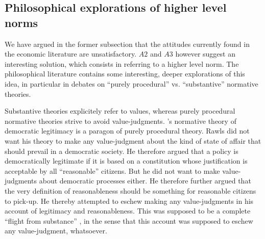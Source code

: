\documentclass[preprint, french, english, 11pt, authoryear]{elsarticle}%
\begin{document}
\subsection{Philosophical explorations of higher level norms}
We have argued in the former subsection that the attitudes currently found in the economic literature are unsatisfactory. $A2$ and $A3$ however suggest an interesting solution, which consists in referring to a higher level norm. The philosophical literature contains some interesting, deeper explorations of this idea, in particular in debates on “purely procedural” vs. “substantive” normative theories.

Substantive theories explicitely refer to values, whereas purely procedural normative theories strive to avoid value-judgments. \cite{rawls_political_2005}'s normative theory of democratic legitimacy is a paragon of purely procedural theory. Rawls did not want his theory to make any value-judgment about the kind of state of affair that should prevail in a democratic society. He therefore argued that a policy is democratically legitimate if it is based on a constitution whose justification is acceptable by all  “reasonable” citizens. But he did not want to make value-judgments about democratic processes either. He therefore further argued that the very definition of reasonableness should be something for reasonable citizens to pick-up. He thereby attempted to eschew making any value-judgments in his account of legitimacy and reasonableness. This was supposed to be a complete ``flight from substance'' \citep{estlund_democratic_2009}, in the sense that this account was supposed to eschew any value-judgment, whatsoever.%
\end{document}
